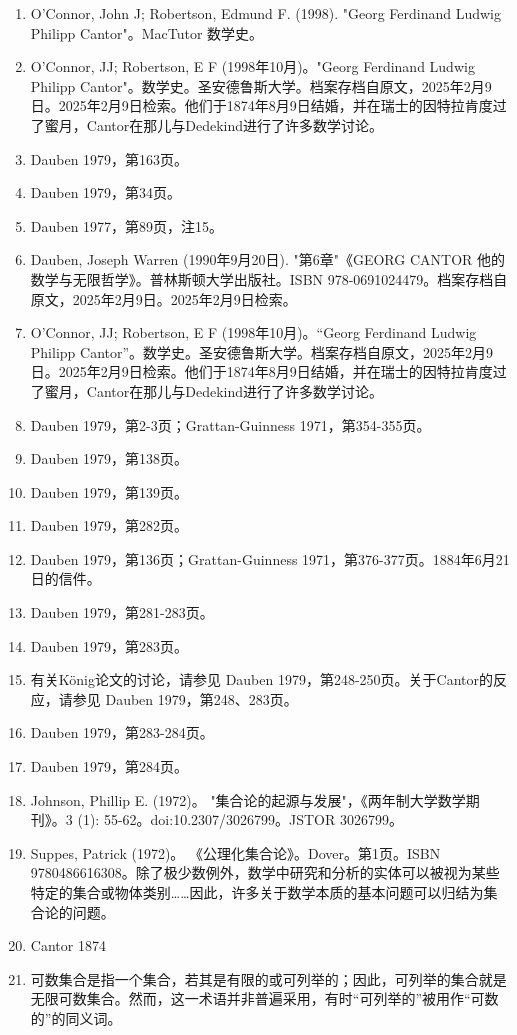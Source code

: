 \begin{enumerate}
\item O'Connor, John J; Robertson, Edmund F. (1998). "Georg Ferdinand Ludwig Philipp Cantor"。MacTutor 数学史。
\item O'Connor, JJ; Robertson, E F (1998年10月)。"Georg Ferdinand Ludwig Philipp Cantor"。数学史。圣安德鲁斯大学。档案存档自原文，2025年2月9日。2025年2月9日检索。他们于1874年8月9日结婚，并在瑞士的因特拉肯度过了蜜月，Cantor在那儿与Dedekind进行了许多数学讨论。
\item Dauben 1979，第163页。
\item Dauben 1979，第34页。
\item Dauben 1977，第89页，注15。
\item Dauben, Joseph Warren (1990年9月20日). "第6章"《GEORG CANTOR 他的数学与无限哲学》。普林斯顿大学出版社。ISBN 978-0691024479。档案存档自原文，2025年2月9日。2025年2月9日检索。
\item O'Connor, JJ; Robertson, E F (1998年10月)。“Georg Ferdinand Ludwig Philipp Cantor”。数学史。圣安德鲁斯大学。档案存档自原文，2025年2月9日。2025年2月9日检索。他们于1874年8月9日结婚，并在瑞士的因特拉肯度过了蜜月，Cantor在那儿与Dedekind进行了许多数学讨论。
\item Dauben 1979，第2-3页；Grattan-Guinness 1971，第354-355页。
\item Dauben 1979，第138页。
\item Dauben 1979，第139页。
\item Dauben 1979，第282页。
\item Dauben 1979，第136页；Grattan-Guinness 1971，第376-377页。1884年6月21日的信件。
\item Dauben 1979，第281-283页。
\item Dauben 1979，第283页。
\item 有关König论文的讨论，请参见 Dauben 1979，第248-250页。关于Cantor的反应，请参见  Dauben 1979，第248、283页。
\item Dauben 1979，第283-284页。
\item Dauben 1979，第284页。
\item Johnson, Phillip E. (1972)。 "集合论的起源与发展"，《两年制大学数学期刊》。3 (1): 55-62。doi:10.2307/3026799。JSTOR 3026799。
\item Suppes, Patrick (1972)。 《公理化集合论》。Dover。第1页。ISBN 9780486616308。除了极少数例外，数学中研究和分析的实体可以被视为某些特定的集合或物体类别……因此，许多关于数学本质的基本问题可以归结为集合论的问题。
\item Cantor 1874
\item 可数集合是指一个集合，若其是有限的或可列举的；因此，可列举的集合就是无限可数集合。然而，这一术语并非普遍采用，有时“可列举的”被用作“可数的”的同义词。

\end{enumerate}
